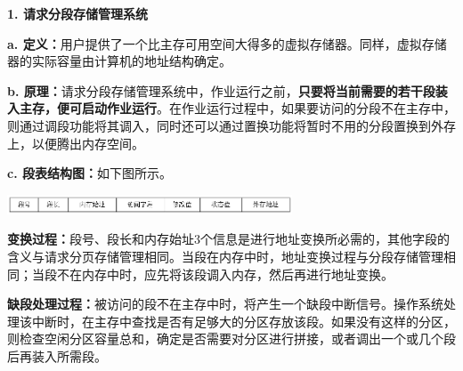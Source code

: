 \textbf{{1. 请求分段存储管理系统}}

\textbf{a.
定义：}用户提供了一个比主存可用空间大得多的虚拟存储器。同样，虚拟存储器的实际容量由计算机的地址结构确定。

{\textbf{b.
原理：}请求分段存储管理系统中，作业运行之}{前，\textbf{只要将当前需要的若干段装入主存，便可启动作业运行}。在作业运行过程中，如果要访问的分段不在主存中，则通过调段功能将其调入，同时还可以通过置换功能将暂时不用的分段置换到外存上，以便腾出内存空间。}

{\textbf{c. 段表结构图：}如下图所示。}

\includegraphics[width=3.33333in,height=0.22917in]{png-jpeg-pics/A9ECDB4463667DDEAB9AA712ED3CF61D.png}

\textbf{变换过程：}段号、段长和内存始址3个信息是进行地址变换所必需的，其他字段的含义与请求分页存储管理相同。当段在内存中时，地址变换过程与分段存储管理相同；当段不在内存中时，应先将该段调入内存，然后再进行地址变换。

\textbf{缺段处理过程：}被访问的段不在主存中时，将产生一个缺段中断信号。操作系统处理该中断时，在主存中查找是否有足够大的分区存放该段。如果没有这样的分区，则检查空闲分区容量总和，确定是否需要对分区进行拼接，或者调出一个或几个段后再装入所需段。
